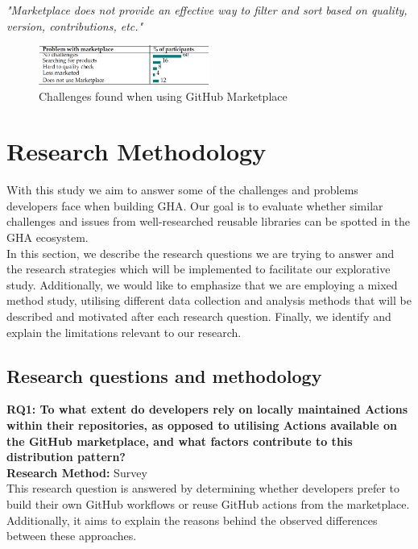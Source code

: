 \documentclass[conference]{IEEEtran}
\begin{document}
\textit{"Marketplace does not provide an effective way to filter and sort based on quality, version, contributions, etc."}\\

\begin{figure} [h]
\includegraphics[width=0.5\textwidth]{Table 1.png}
\caption{Challenges found when using GitHub Marketplace \cite{saroar2023developers} }
\end{figure}


\section{Research Methodology}
    With this study we aim to answer some of the challenges and problems developers face when building GHA. Our goal is to evaluate whether similar challenges and issues from well-researched reusable libraries can be spotted in the GHA ecosystem.\\

    In this section, we describe the research questions we are trying to answer and the research strategies which will be implemented to facilitate our explorative study. Additionally, we would like to emphasize that we are employing a mixed method study, utilising different data collection and analysis methods that will be described and motivated after each research question. Finally, we identify and explain the limitations relevant to our research.

    \subsection{Research questions and methodology}


        \textbf{RQ1: To what extent do developers rely on locally maintained Actions within their repositories, as opposed to utilising Actions available on the GitHub marketplace, and what factors contribute to this distribution pattern?}\\

        \textbf{Research Method:} Survey\\
            
        This research question is answered by determining whether developers prefer to build their own GitHub workflows or reuse GitHub actions from the marketplace. Additionally, it aims to explain the reasons behind the observed differences between these approaches.\\
\end{document}
